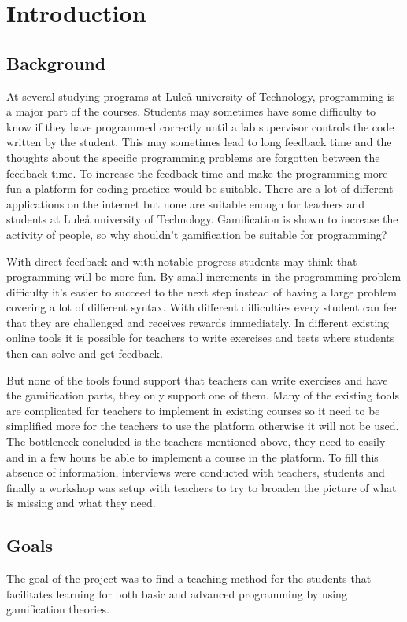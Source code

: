 \chapter{Introduction}
\section{Background} 
At several studying programs at Luleå university of Technology, programming is a major part of the courses. Students may sometimes have some difficulty to know if they have programmed correctly until a lab supervisor controls the code written by the student. This may sometimes lead to long feedback time and the thoughts about the specific programming problems are forgotten between the feedback time. To increase the feedback time and make the programming more fun a platform for coding practice would be suitable. There are a lot of different applications on the internet but none are suitable enough for teachers and students at Luleå university of Technology. Gamification is shown to increase the activity of people, so why shouldn't gamification be suitable for programming? 

With direct feedback and with notable progress students may think that programming will be more fun. By small increments in the programming problem difficulty it's easier to succeed to the next step instead of having a large problem covering a lot of different syntax. With different difficulties every student can feel that they are challenged and receives rewards immediately. In different existing online tools it is possible for teachers to write exercises and tests where students then can solve and get feedback. 

But none of the tools found support that teachers can write exercises and have the gamification parts, they only support one of them. Many of the existing tools are complicated for teachers to implement in existing courses so it need to be simplified more for the teachers to use the platform otherwise it will not be used. The bottleneck concluded is the teachers mentioned above, they need to easily and in a few hours be able to implement a course in the platform. To fill this absence of information, interviews were conducted with teachers, students and finally a workshop was setup with teachers to try to broaden the picture of what is missing and what they need.


\section{Goals}   
The goal of the project was to find a teaching method for the students that facilitates learning for both basic and advanced programming by using gamification theories.

